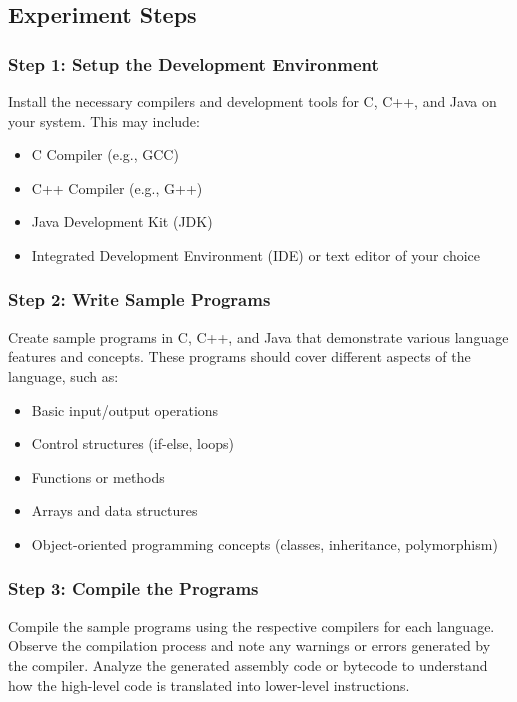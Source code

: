 \documentclass[12pt]{article}
\begin{document}
\subsection*{Experiment Steps}

\subsubsection*{Step 1: Setup the Development Environment}
Install the necessary compilers and development tools for C, C++, and Java on your system. This may include:
\begin{itemize}
    \item C Compiler (e.g., GCC)
    \item C++ Compiler (e.g., G++)
    \item Java Development Kit (JDK)
    \item Integrated Development Environment (IDE) or text editor of your choice
\end{itemize}

\subsubsection*{Step 2: Write Sample Programs}
Create sample programs in C, C++, and Java that demonstrate various language features and concepts. These programs should cover different aspects of the language, such as:
\begin{itemize}
    \item Basic input/output operations
    \item Control structures (if-else, loops)
    \item Functions or methods
    \item Arrays and data structures
    \item Object-oriented programming concepts (classes, inheritance, polymorphism)
\end{itemize}

\subsubsection*{Step 3: Compile the Programs}
Compile the sample programs using the respective compilers for each language. Observe the compilation process and note any warnings or errors generated by the compiler. Analyze the generated assembly code or bytecode to understand how the high-level code is translated into lower-level instructions.
\end{document}
